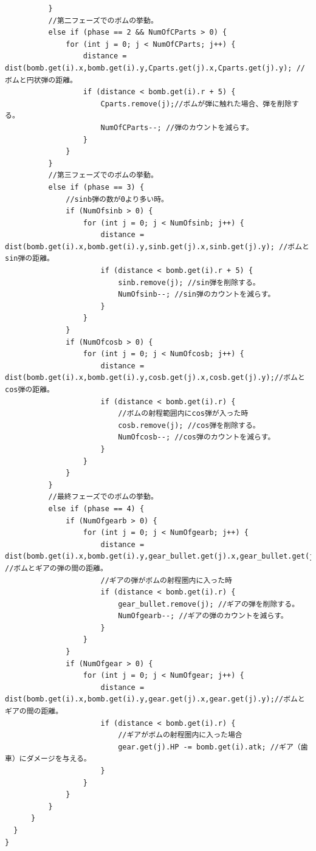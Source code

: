\documentclass[a4paper,titlepage,11pt]{ltjsarticle}
\begin{document}
\begin{lstlisting}
          }
          //第二フェーズでのボムの挙動。
          else if (phase == 2 && NumOfCParts > 0) {
              for (int j = 0; j < NumOfCParts; j++) {
                  distance = dist(bomb.get(i).x,bomb.get(i).y,Cparts.get(j).x,Cparts.get(j).y); //ボムと円状弾の距離。
                  if (distance < bomb.get(i).r + 5) {
                      Cparts.remove(j);//ボムが弾に触れた場合、弾を削除する。
                      NumOfCParts--; //弾のカウントを減らす。
                  }
              }
          }
          //第三フェーズでのボムの挙動。
          else if (phase == 3) {
              //sinb弾の数が0より多い時。
              if (NumOfsinb > 0) {
                  for (int j = 0; j < NumOfsinb; j++) {
                      distance = dist(bomb.get(i).x,bomb.get(i).y,sinb.get(j).x,sinb.get(j).y); //ボムとsin弾の距離。
                      if (distance < bomb.get(i).r + 5) {
                          sinb.remove(j); //sin弾を削除する。
                          NumOfsinb--; //sin弾のカウントを減らす。
                      }
                  }
              }
              if (NumOfcosb > 0) {
                  for (int j = 0; j < NumOfcosb; j++) {
                      distance = dist(bomb.get(i).x,bomb.get(i).y,cosb.get(j).x,cosb.get(j).y);//ボムとcos弾の距離。
                      if (distance < bomb.get(i).r) {
                          //ボムの射程範囲内にcos弾が入った時
                          cosb.remove(j); //cos弾を削除する。
                          NumOfcosb--; //cos弾のカウントを減らす。
                      }
                  }
              }
          }
          //最終フェーズでのボムの挙動。
          else if (phase == 4) {
              if (NumOfgearb > 0) {
                  for (int j = 0; j < NumOfgearb; j++) {
                      distance = dist(bomb.get(i).x,bomb.get(i).y,gear_bullet.get(j).x,gear_bullet.get(j).y); //ボムとギアの弾の間の距離。
                      //ギアの弾がボムの射程圏内に入った時
                      if (distance < bomb.get(i).r) {
                          gear_bullet.remove(j); //ギアの弾を削除する。
                          NumOfgearb--; //ギアの弾のカウントを減らす。
                      }
                  }
              }
              if (NumOfgear > 0) {
                  for (int j = 0; j < NumOfgear; j++) {
                      distance = dist(bomb.get(i).x,bomb.get(i).y,gear.get(j).x,gear.get(j).y);//ボムとギアの間の距離。
                      if (distance < bomb.get(i).r) {
                          //ギアがボムの射程圏内に入った場合
                          gear.get(j).HP -= bomb.get(i).atk; //ギア（歯車）にダメージを与える。
                      }
                  }
              }
          }
      }
  }
}
\end{lstlisting}
\end{document}
